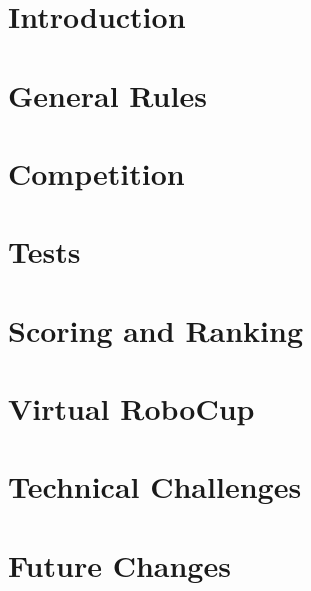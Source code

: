 \documentclass[11pt, twoside, openright, a4paper, chapterprefix]{scrbook}
\begin{document}


\pagestyle{empty}

\tableofcontents
\clearpage

\pagestyle{plain}



\chapter{Introduction}



%


\chapter{General Rules}


\chapter{Competition}


\chapter{Tests}



\chapter{Scoring and Ranking}


\chapter{Virtual RoboCup}
\label{cha: VRC}


\chapter{Technical Challenges} \label{cha:TechnicalChallenges}
\label{cha: TCHA}


\chapter{Future Changes}
\label{cha: Future}

\end{document}
